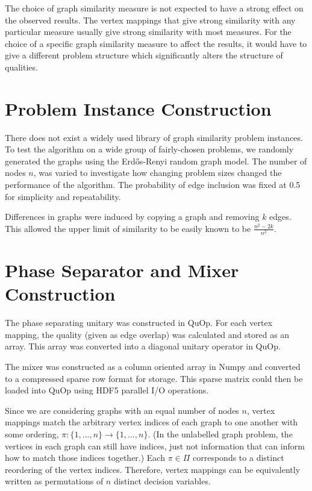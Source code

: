 The choice of graph similarity measure is not expected to have a strong effect on the observed results. The vertex mappings that give strong similarity with any particular measure usually give strong similarity with most measures. For the choice of a specific graph similarity measure to affect the results, it would have to give a different problem structure which significantly alters the structure of qualities.

\section{Problem Instance Construction}
There does not exist a widely used library of graph similarity problem instances. To test the algorithm on a wide group of fairly-chosen problems, we randomly generated the graphs using the Erdős-Renyi random graph model.
The number of nodes $n$, was varied to investigate how changing problem sizes changed the performance of the algorithm. The probability of edge inclusion was fixed at 0.5 for simplicity and repeatability.

Differences in graphs were induced by copying a graph and removing $k$ edges. This allowed the upper limit of similarity to be easily known to be $\frac{n^2-2k}{n^2}$.

\section{Phase Separator and Mixer Construction}
The phase separating unitary was constructed in QuOp. For each vertex mapping, the quality (given as edge overlap) was calculated and stored as an array. This array was converted into a diagonal unitary operator in QuOp.

The mixer was constructed as a column oriented array in Numpy and converted to a compressed sparse row format for storage. This sparse matrix could then be loaded into QuOp using HDF5 parallel I/O operations.

Since we are considering graphs with an equal number of nodes $n$, vertex mappings match the arbitrary vertex indices of each graph to one another with some ordering, $\pi:\{1,...,n\}\to\{1,...,n\}$. (In the unlabelled graph problem, the vertices in each graph can still have indices, just not information that can inform how to match those indices together.) Each $\pi\in\Pi$ corresponds to a distinct reordering of the vertex indices. Therefore, vertex mappings can be equivalently written as permutations of $n$ distinct decision variables.

